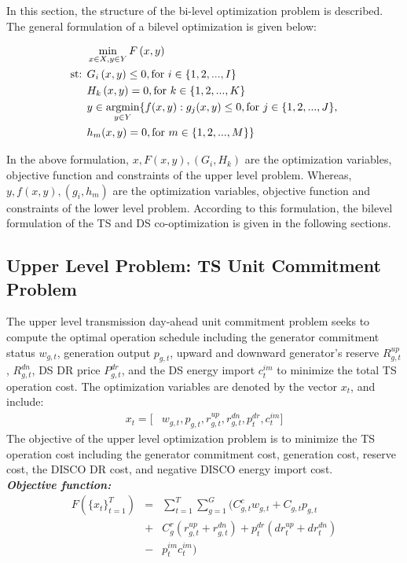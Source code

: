 In this section, the structure of the bi-level optimization problem is described. The general formulation of a bilevel optimization is given below:

\begin{align}
\begin{aligned}
&\operatorname*{min}_{x\in X, y\in Y}F\left(x,y\right) \\
\text{st:   }  & G_i\left(x,y\right)\leq 0, \text{for   }  i \in \{1,2,...,I\}\label{prime}\\
& H_k\left(x,y\right) = 0, \text{for   }  k \in \{1,2,...,K\}\\
& y\in \operatorname*{argmin}_{y\in Y} \{f(x,y): g_j(x,y)\leq 0, \text{for   }  j \in \{1,2,...,J\}, \\ 
                                                   &h_m(x,y) = 0, \text{for   }  m \in \{1,2,...,M\}  \}
\end{aligned}
\end{align}


In the above formulation, $x,F(x,y),(G_i, H_k)$ are the optimization variables, objective function and constraints of the upper level problem. Whereas, $y,f(x,y),(g_i,h_m)$ are the optimization variables, objective function and constraints of the lower level problem. According to this formulation, the bilevel formulation of the TS and DS co-optimization is given in the following sections. 

\subsection{Upper Level Problem: TS Unit Commitment Problem}

The upper level transmission day-ahead unit commitment problem seeks to compute the optimal operation schedule including the generator commitment status $w_{g,t}$, generation output $p_{g,t}$, upward and downward generator's reserve $R^{up}_{g,t}$, $R^{dn}_{g,t}$, DS DR price $P^{dr}_{g,t}$, and the DS energy import $c^{im}_{t}$ to minimize the total TS operation cost. The optimization variables are denoted by the vector $x_t$, and include:
\begin{align*}
x_t=[&w_{g,t}, p_{g,t}, r_{g,t}^{up}, r_{g,t}^{dn}, p^{dr}_{t}, c^{im}_{t}]
\end{align*}
The objective of the upper level optimization problem is to minimize the TS operation cost including the generator commitment cost, generation cost, reserve cost,  the DISCO DR cost, and negative DISCO energy import cost. \\
\textbf{\emph{Objective function:} }
\begin{equation*}
\begin{array}{lcl}
F(\{x_t\}^{T}_{t=1}) &=& \sum_{t=1}^{T}\sum_{g=1}^{G}(C^c_{g,t} w_{g,t}+C_{g,t} p_{g,t}\\
&+&C^r_{g}(r_{g,t}^{up}+r_{g,t}^{dn})+p^{dr}_{t}(dr_{t}^{up}+dr_{t}^{dn})\\
&-&p^{im}_{t}c^{im}_{t})
\end{array}
\label{eqn:obj}
\end{equation*}

